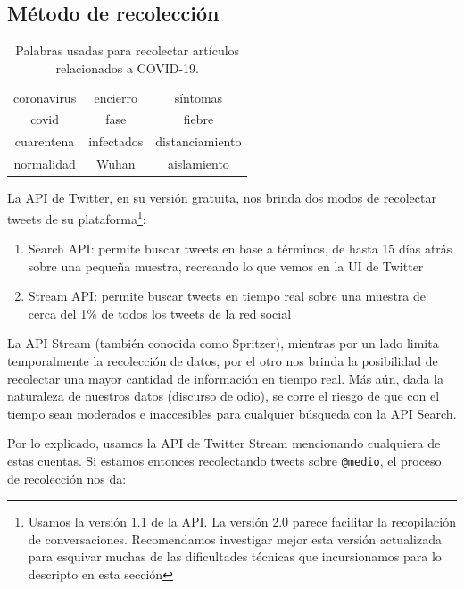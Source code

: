 \subsection{Método de recolección}

\begin{table}[t]
    \centering
    \begin{tabular}{ c|c|c }
        coronavirus  &  encierro          & síntomas \\
        covid        &  fase              & fiebre   \\
        cuarentena   &  infectados        & distanciamiento     \\
        normalidad   &  Wuhan             & aislamiento\\
    \end{tabular}
    \caption{Palabras usadas para recolectar artículos relacionados a COVID-19.\label{tab:article_words}}
\end{table}


La API de Twitter, en su versión gratuita, nos brinda dos modos de recolectar tweets de su plataforma\footnote{Usamos la versión 1.1 de la API. La versión 2.0 parece facilitar la recopilación de conversaciones. Recomendamos investigar mejor esta versión actualizada para esquivar muchas de las dificultades técnicas que incursionamos para lo descripto en esta sección}:

\begin{enumerate}
    \item Search API: permite buscar tweets en base a términos, de hasta 15 días atrás sobre una pequeña muestra, recreando lo que vemos en la UI de Twitter
    \item Stream API: permite buscar tweets en tiempo real sobre una muestra de cerca del 1\% de todos los tweets de la red social
\end{enumerate}

La API Stream (también conocida como Spritzer), mientras por un lado limita temporalmente la recolección de datos, por el otro nos brinda la posibilidad de recolectar una mayor cantidad de información en tiempo real. Más aún, dada la naturaleza de nuestros datos (discurso de odio), se corre el riesgo de que con el tiempo sean moderados e inaccesibles para cualquier búsqueda con la API Search.

Por lo explicado, usamos la API de Twitter Stream mencionando cualquiera de estas cuentas. Si estamos entonces recolectando tweets sobre \verb|@medio|, el proceso de recolección nos da:

